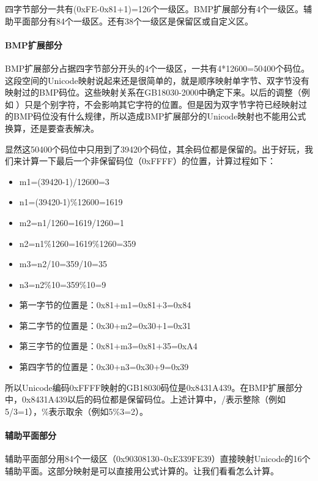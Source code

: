 \documentclass[cn,hazy,blue,14pt,screen]{elegantnote}
\begin{document}
四字节部分一共有(0xFE-0x81+1)=126个一级区。BMP扩展部分有4个一级区。辅助平面部分有84个一级区。还有38个一级区是保留区或自定义区。

\hypertarget{bmpux6269ux5c55ux90e8ux5206}{%
\paragraph{BMP扩展部分}\label{bmpux6269ux5c55ux90e8ux5206}}

BMP扩展部分占据四字节部分开头的4个一级区，一共有4*12600=50400个码位。这段空间的Unicode映射说起来还是很简单的，就是顺序映射单字节、双字节没有映射过的BMP码位。这些映射关系在GB18030-2000中确定下来。以后的调整（例如）只是个别字符，不会影响其它字符的位置。但是因为双字节字符已经映射过的BMP码位没有什么规律，所以造成BMP扩展部分的Unicode映射也不能用公式换算，还是要查表解决。

显然这50400个码位中只用到了39420个码位，其余码位都是保留的。出于好玩，我们来计算一下最后一个非保留码位（0xFFFF）的位置，计算过程如下：

\begin{itemize}

\item
  m1=(39420-1)/12600=3
\item
  n1=(39420-1)\%12600=1619
\item
  m2=n1/1260=1619/1260=1
\item
  n2=n1\%1260=1619\%1260=359
\item
  m3=n2/10=359/10=35
\item
  n3=n2\%10=359\%10=9
\item
  第一字节的位置是：0x81+m1=0x81+3=0x84
\item
  第二字节的位置是：0x30+m2=0x30+1=0x31
\item
  第三字节的位置是：0x81+m3=0x81+35=0xA4
\item
  第四字节的位置是：0x30+n3=0x30+9=0x39
\end{itemize}

所以Unicode编码0xFFFF映射的GB18030码位是0x8431A439。在BMP扩展部分中，0x8431A439以后的码位都是保留码位。上述计算中，/表示整除（例如5/3=1），\%表示取余（例如5\%3=2）。

\hypertarget{ux8f85ux52a9ux5e73ux9762ux90e8ux5206}{%
\paragraph{辅助平面部分}\label{ux8f85ux52a9ux5e73ux9762ux90e8ux5206}}

辅助平面部分用84个一级区（0x90308130\textasciitilde0xE339FE39）直接映射Unicode的16个辅助平面。这部分映射是可以直接用公式计算的。让我们看看怎么计算。
\end{document}
